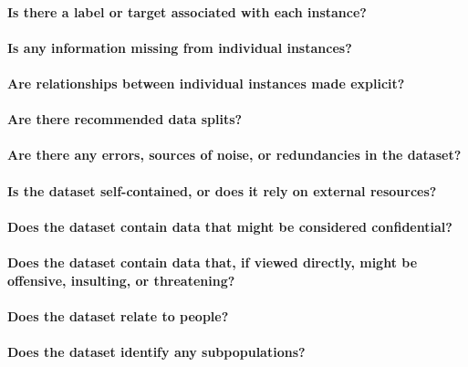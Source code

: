 \paragraph{Is there a label or target associated with each instance?}

\paragraph{Is any information missing from individual instances?}

\paragraph{Are relationships between individual instances made explicit?}

\paragraph{Are there recommended data splits?}

\paragraph{Are there any errors, sources of noise, or redundancies in the dataset?}

\paragraph{Is the dataset self-contained, or does it rely on external resources?}

\paragraph{Does the dataset contain data that might be considered confidential?}

\paragraph{Does the dataset contain data that, if viewed directly, might be offensive, insulting, or threatening?}

\paragraph{Does the dataset relate to people?} 

\paragraph{Does the dataset identify any subpopulations?}

